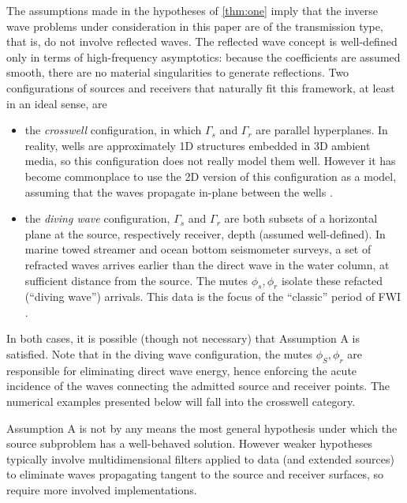 The assumptions made in the hypotheses of \ref{thm:one} imply that the inverse wave problems under consideration in this paper are of the transmission type, that is, do not involve reflected waves. The reflected wave concept is well-defined only in terms of high-frequency asymptotics: because the coefficients are assumed smooth, there are no material singularities to generate reflections.  Two configurations of sources and receivers that naturally fit this framework, at least in an ideal sense, are
\begin{itemize}
\item the {\em crosswell} configuration, in which $\Gamma_s$ and $\Gamma_r$ are parallel hyperplanes. In reality, wells are approximately 1D structures embedded in 3D ambient media, so this configuration does not really model them well. However it has become commonplace to use the 2D version of this configuration as a model, assuming that the waves propagate in-plane between the wells  \cite[]{BregChapBai:86,Harr:93,Zhouetal:93,Pratt:99b,Plessix:00}.
\item the {\em diving wave} configuration, $\Gamma_s$ and $\Gamma_r$ are both subsets of a horizontal plane at the source, respectively receiver, depth (assumed well-defined). In marine towed streamer and ocean bottom seismometer surveys, a set of refracted waves arrives earlier than the direct wave in the water column, at sufficient distance from the source. The mutes $\phi_s, \phi_r$ isolate these refacted (``diving wave'') arrivals. This data is the focus of the ``classic'' period of FWI \cite[]{SirgPratt02,BrendersPratt:06a,BrendersPratt:06b,VirieuxOperto:09,Vigh:10,Vigh13}.
\end{itemize}
In both cases, it is possible (though not necessary) that Assumption A is satisfied. Note that in the diving wave configuration, the mutes $\phi_S,\phi_r$ are responsible for eliminating direct wave energy, hence enforcing the acute incidence of the waves connecting the admitted source and receiver points. The numerical examples presented below will fall into the crosswell category. 

Assumption A is not by any means the most general hypothesis under which the source subproblem has a well-behaved solution. However weaker hypotheses typically involve multidimensional filters applied to data (and extended sources) to eliminate waves propagating tangent to the source and receiver surfaces, so require more involved implementations. 





